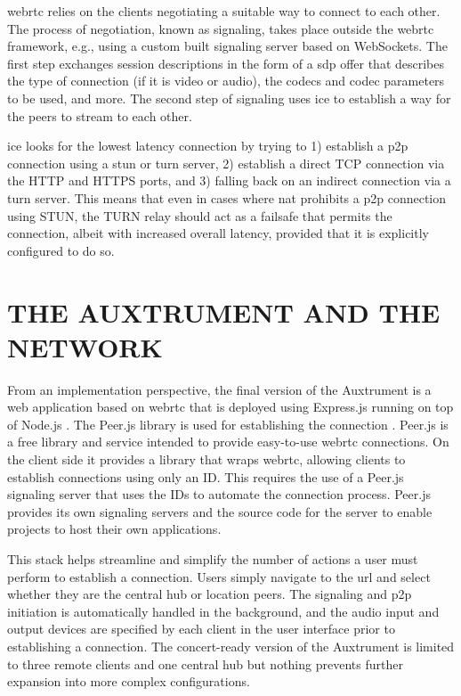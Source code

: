 \documentclass[fleqn]{jaes}
\begin{document}
\gls{webrtc} relies on the clients negotiating a suitable way to connect to each other. The process of negotiation, known as signaling, takes place outside the \gls{webrtc} framework, e.g., using a custom built signaling server based on WebSockets. The first step exchanges session descriptions in the form of a \gls{sdp} offer that describes the type of connection (if it is video or audio), the codecs and codec parameters to be used, and more. The second step of signaling uses \gls{ice} to establish a way for the peers to stream to each other.

\gls{ice} looks for the lowest latency connection by trying to 1) establish a \gls{p2p} connection using a \gls{stun} or \gls{turn} server, 2) establish a direct TCP connection via the HTTP and HTTPS ports, and 3) falling back on an indirect connection via a \gls{turn} server. This means that even in cases where \gls{nat} prohibits a \gls{p2p} connection using STUN, the TURN relay should act as a failsafe that permits the connection, albeit with increased overall latency, provided that it is explicitly configured to do so.

\section{THE AUXTRUMENT AND THE NETWORK}
From an implementation perspective, the final version of the Auxtrument is a web application based on \gls{webrtc} that is deployed using Express.js \cite{noauthor_express_nodate} running on top of Node.js \cite{noauthor_nodejs_nodate}. The Peer.js library is used for establishing the connection \cite{noauthor_peerjs_nodate}. Peer.js is a free library and service intended to provide easy-to-use \gls{webrtc} connections. On the client side it provides a library that wraps \gls{webrtc}, allowing clients to establish connections using only an ID. This requires the use of a Peer.js signaling server that uses the IDs to automate the connection process. Peer.js provides its own signaling servers and the source code for the server to enable projects to host their own applications. 

This stack helps streamline and simplify the number of actions a user must perform to establish a connection. Users simply navigate to the \gls{url} and select whether they are the central hub or location peers. The signaling and \gls{p2p} initiation is automatically handled in the background, and the audio input and output devices are specified by each client in the user interface prior to establishing a connection. The concert-ready version of the Auxtrument is limited to three remote clients and one central hub but nothing prevents further expansion into more complex configurations.
\end{document}
